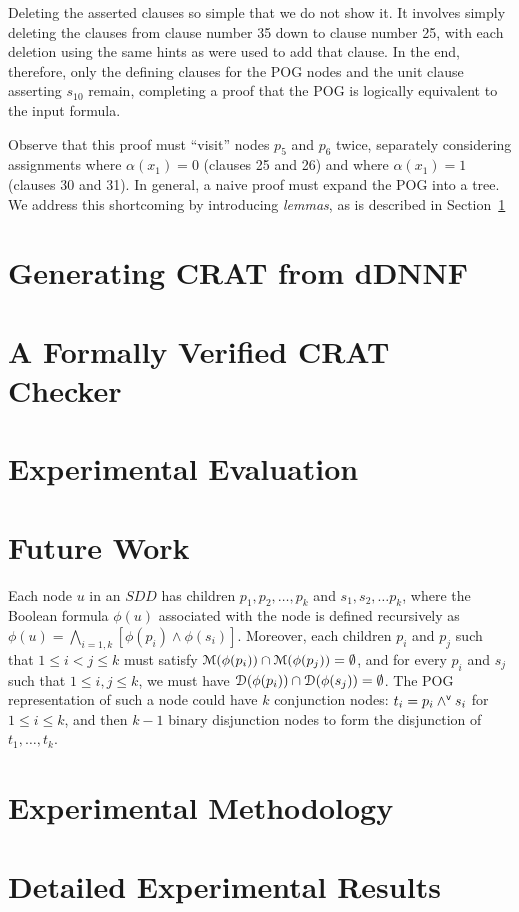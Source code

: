 \documentclass[letterpaper,USenglish,cleveref, autoref, thm-restate]{lipics-v2021}
\newcommand{\pand}{\mathbin{\land^{\sf v}}}
\newcommand{\dependencyset}{{\cal D}}
\newcommand{\assign}{\alpha}
\newcommand{\modelset}{{\cal M}}
\begin{document}
Deleting the asserted clauses so simple that we do not show it.  It
involves simply deleting the clauses from clause number 35 down to
clause number 25, with each deletion using the same hints as were used
to add that clause.  In the end, therefore, only the defining clauses
for the POG nodes and the unit clause asserting $s_{10}$ remain,
completing a proof that the POG is logically equivalent to the input
formula.

Observe that this proof must ``visit'' nodes
$p_5$ and $p_6$ twice, separately considering assignments where $\assign(x_1) = 0$
(clauses 25 and 26) and where $\assign(x_1) = 1$ (clauses 30 and 31).  In
general, a naive proof must expand the POG into a tree.
We address this shortcoming by introducing {\em lemmas}, as is described in Section~\ref{sect:lemma}



\section{Generating CRAT from dDNNF}

\label{sect:lemma}

\section{A Formally Verified CRAT Checker}

\section{Experimental Evaluation}

\section{Future Work}
\label{sect:future}


Each node $u$ in an $SDD$ has children $p_1, p_2, \ldots, p_k$ and
$s_1, s_2, \ldots p_k$, where the Boolean formula $\phi(u)$ associated
with the node is defined recursively as $\phi(u) = \bigwedge_{i=1,k}
[\phi(p_i) \land \phi(s_i)]$.  Moreover, each children $p_i$ and $p_j$
such that $1 \leq i < j \leq k$ must satisfy $\modelset(\phi(p_i))
\cap \modelset(\phi(p_j)) = \emptyset$, and for every $p_i$ and $s_j$
such that $1 \leq i,j \leq k$, we must have $\dependencyset(\phi(p_i))
\cap \dependencyset(\phi(s_j)) = \emptyset$.  The POG representation
of such a node could have $k$ conjunction nodes: $t_i = p_i \pand s_i$
for $1 \leq i \leq k$, and then $k-1$ binary disjunction nodes to form
the disjunction of $t_1, \ldots, t_k$.




\appendix

\section{Experimental Methodology}

\section{Detailed Experimental Results}
\end{document}

